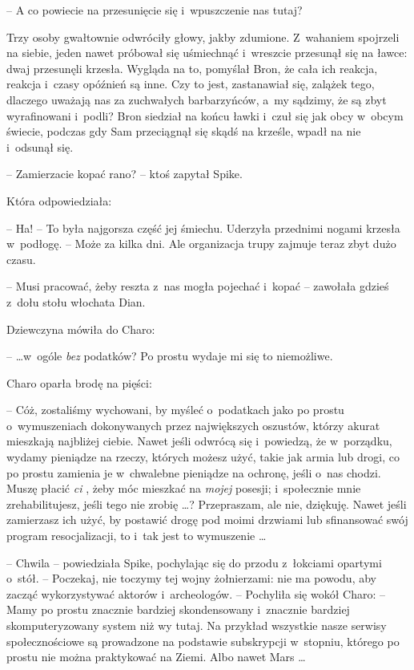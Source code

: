 \documentclass[oneside,polish,11pt,rmheadings]{mwbk}
\begin{document}
-- A co powiecie na przesunięcie się i~wpuszczenie nas tutaj? 

Trzy osoby gwałtownie odwróciły głowy, jakby zdumione. Z~wahaniem spojrzeli na siebie, jeden nawet próbował się uśmiechnąć i~wreszcie przesunął się na ławce: dwaj przesunęli krzesła. Wygląda na to, pomyślał Bron, że cała ich reakcja, reakcja i~czasy opóźnień są inne. Czy to jest, zastanawiał się, zalążek tego, dlaczego uważają nas za zuchwałych barbarzyńców, a~my sądzimy, że są zbyt wyrafinowani i~podli? Bron siedział na końcu ławki i~czuł się jak obcy w~obcym świecie, podczas gdy Sam przeciągnął się skądś na krześle, wpadł na nie i~odsunął się. 

-- Zamierzacie kopać rano? -- ktoś zapytał Spike. 

Która odpowiedziała: 

-- Ha! -- To była najgorsza część jej śmiechu. Uderzyła przednimi nogami krzesła w~podłogę. -- Może za kilka dni. Ale organizacja trupy zajmuje teraz zbyt dużo czasu. 

-- Musi pracować, żeby reszta z~nas mogła pojechać i~kopać -- zawołała gdzieś z~dołu stołu włochata Dian. 

Dziewczyna mówiła do Charo: 

--  \ldots w~ogóle \textit{bez }podatków? Po prostu wydaje mi się to niemożliwe. 

Charo oparła brodę na pięści:

 -- Cóż, zostaliśmy wychowani, by myśleć o~podatkach jako po prostu o~wymuszeniach dokonywanych przez największych oszustów, którzy akurat mieszkają najbliżej ciebie. Nawet jeśli odwrócą się i~powiedzą, że w~porządku, wydamy pieniądze na rzeczy, których możesz użyć, takie jak armia lub drogi, co po prostu zamienia je w~chwalebne pieniądze na ochronę, jeśli o~nas chodzi. Muszę płacić \textit{ci }, żeby móc mieszkać na \textit{mojej }posesji; i~społecznie mnie zrehabilitujesz, jeśli tego nie zrobię \ldots ? Przepraszam, ale nie, dziękuję. Nawet jeśli zamierzasz ich użyć, by postawić drogę pod moimi drzwiami lub sfinansować swój program resocjalizacji, to i~tak jest to wymuszenie \ldots  

-- Chwila -- powiedziała Spike, pochylając się do przodu z~łokciami opartymi o~stół. -- Poczekaj, nie toczymy tej wojny żołnierzami: nie ma powodu, aby zacząć wykorzystywać aktorów i~archeologów. --  Pochyliła się wokół Charo: -- Mamy po prostu znacznie bardziej skondensowany i~znacznie bardziej skomputeryzowany system niż wy tutaj. Na przykład wszystkie nasze serwisy społecznościowe są prowadzone na podstawie subskrypcji w~stopniu, którego po prostu nie można praktykować na Ziemi. Albo nawet Mars \ldots  
\end{document}
